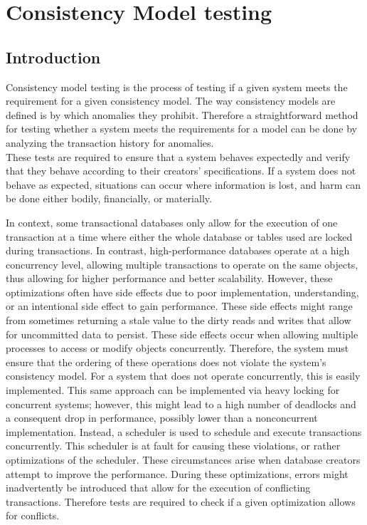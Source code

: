 \documentclass[a4paper,10pt,titlepage]{report}
\begin{document}

\newpage

\chapter{Consistency Model testing}

\section{Introduction}
Consistency model testing is the process of testing if a given system meets the requirement for a given consistency model. The way consistency models are defined is by which anomalies they prohibit. Therefore a straightforward method for testing whether a system meets the requirements for a model can be done by analyzing the transaction history for anomalies.\\
\vspace{5mm}
These tests are required to ensure that a system behaves expectedly and verify that they behave according to their creators' specifications. If a system does not behave as expected, situations can occur where information is lost, and harm can be done either bodily, financially, or materially. \\ \vspace{5mm}

In context, some transactional databases only allow for the execution of one transaction at a time where either the whole database or tables used are locked during transactions. In contrast, high-performance databases operate at a high concurrency level, allowing multiple transactions to operate on the same objects, thus allowing for higher performance and better scalability. However, these optimizations often have side effects due to poor implementation, understanding, or an intentional side effect to gain performance. These side effects might range from sometimes returning a stale value to the dirty reads and writes that allow for uncommitted data to persist. These side effects occur when allowing multiple processes to access or modify objects concurrently. Therefore, the system must ensure that the ordering of these operations does not violate the system's consistency model. For a system that does not operate concurrently, this is easily implemented. This same approach can be implemented via heavy locking for concurrent systems; however, this might lead to a high number of deadlocks and a consequent drop in performance, possibly lower than a nonconcurrent implementation. Instead, a scheduler is used to schedule and execute transactions concurrently. This scheduler is at fault for causing these violations, or rather optimizations of the scheduler. 
These circumstances arise when database creators attempt to improve the performance. During these optimizations, errors might inadvertently be introduced that allow for the execution of conflicting transactions. Therefore tests are required to check if a given optimization allows for conflicts.
\end{document}
